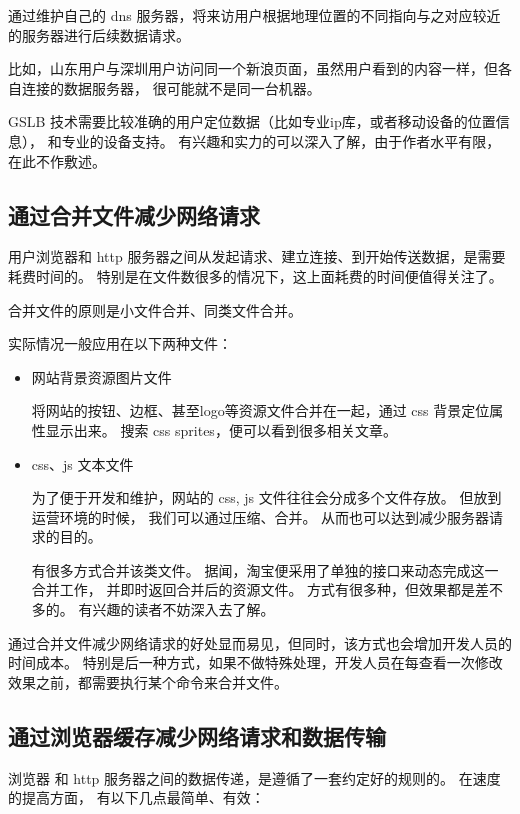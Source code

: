 \documentclass{article}
\begin{document}
  通过维护自己的 dns 服务器，将来访用户根据地理位置的不同指向与之对应较近的服务器进行后续数据请求。

  比如，山东用户与深圳用户访问同一个新浪页面，虽然用户看到的内容一样，但各自连接的数据服务器，
  很可能就不是同一台机器。

  GSLB 技术需要比较准确的用户定位数据（比如专业ip库，或者移动设备的位置信息），
  和专业的设备支持。 有兴趣和实力的可以深入了解，由于作者水平有限，在此不作敷述。
  
  \subsection{通过合并文件减少网络请求}

  用户浏览器和 http 服务器之间从发起请求、建立连接、到开始传送数据，是需要耗费时间的。
  特别是在文件数很多的情况下，这上面耗费的时间便值得关注了。

  合并文件的原则是小文件合并、同类文件合并。

  实际情况一般应用在以下两种文件：

  \begin{itemize}
  \item 网站背景资源图片文件

    将网站的按钮、边框、甚至logo等资源文件合并在一起，通过 css 背景定位属性显示出来。
    搜索 css sprites，便可以看到很多相关文章。
    
  \item css、js 文本文件

    为了便于开发和维护，网站的 css, js 文件往往会分成多个文件存放。 但放到运营环境的时候，
    我们可以通过压缩、合并。 从而也可以达到减少服务器请求的目的。

    有很多方式合并该类文件。 据闻，淘宝便采用了单独的接口来动态完成这一合并工作，
    并即时返回合并后的资源文件。 方式有很多种，但效果都是差不多的。 有兴趣的读者不妨深入去了解。
  \end{itemize}

  通过合并文件减少网络请求的好处显而易见，但同时，该方式也会增加开发人员的时间成本。
  特别是后一种方式，如果不做特殊处理，开发人员在每查看一次修改效果之前，都需要执行某个命令来合并文件。
  
  \subsection{通过浏览器缓存减少网络请求和数据传输}

  浏览器 和 http 服务器之间的数据传递，是遵循了一套约定好的规则的。 在速度的提高方面，
  有以下几点最简单、有效：
\end{document}

